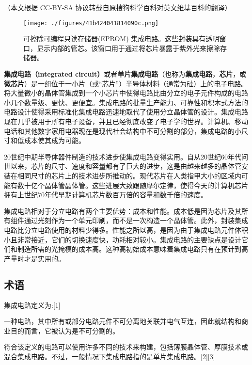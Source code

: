 
（本文根据 CC-BY-SA 协议转载自原搜狗科学百科对英文维基百科的翻译）

\begin{figure}[ht]
\centering
\texttt{[image: ./figures/41b424041814090c.png]}
\caption{可擦除可编程只读存储器(EPROM) 集成电路。这些封装具有透明窗口，显示内部的管芯。该窗口用于通过将芯片暴露于紫外光来擦除存储器。} \label{fig_icJCDL_1}
\end{figure}

\textbf{集成电路（integrated circuit）}或者\textbf{单片集成电路}（也称为\textbf{集成电路}，\textbf{芯片}，或\textbf{微芯片}）是一组位于一小片（或“芯片”）半导体材料（通常为硅）上的电子电路。将大量微小的晶体管集成到一个小芯片中使得电路比由分立的电子元件构成的电路小几个数量级、更快、更便宜。集成电路的批量生产能力、可靠性和积木式方法的电路设计使得采用标准化集成电路迅速地取代了使用分立晶体管的设计。集成电路现在几乎被用于所有电子设备，并且已经彻底改变了电子学的世界。计算机、移动电话和其他数字家用电器现在是现代社会结构中不可分割的部分，集成电路的小尺寸和低成本使其成为可能。

20世纪中期半导体器件制造的技术进步使集成电路变得实用。自从20世纪60年代问世以来，芯片的尺寸、速度和容量都有了巨大的进步，这是由越来越多的晶体管安装在相同尺寸的芯片上的技术进步所推动的。现代芯片在人类指甲大小的区域内可能有数十亿个晶体管晶体管。这些进展大致跟随摩尔定律，使得今天的计算机芯片拥有上世纪70年代早期计算机芯片数百万倍的容量和数千倍的速度。

集成电路相对于分立电路有两个主要优势：成本和性能。成本低是因为芯片及其所有组件通过光刻作为一个单元印刷，而不是一次构造一个晶体管。此外，封装集成电路比分立电路使用的材料少得多。性能之所以高，是因为由于集成电路元件体积小且非常接近，它们的切换速度快，功耗相对较小。集成电路的主要缺点是设计它们和制造所需的光掩模的成本高。这种高初始成本意味着集成电路只有在预计到高产量时才是实用的。

\subsection{术语}

集成电路定义为:[1]

一种电路，其中所有或部分电路元件不可分离地关联并电气互连，因此就结构和商业目的而言，它被认为是不可分割的。

符合该定义的电路可以使用许多不同的技术来构建，包括薄膜晶体管、厚膜技术或混合集成电路。不过，一般情况下集成电路指的是单片集成电路。[2][3]

